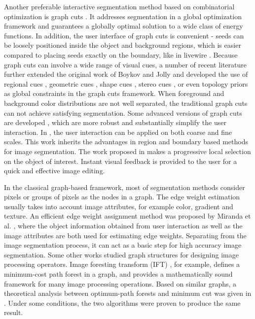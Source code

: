 Another preferable interactive segmentation method based on combinatorial optimization is graph cuts \cite{Yuri01,Yuri06}. It addresses segmentation in a global optimization framework and guarantees a globally optimal solution to a wide class of energy functions. In addition, the user interface of graph cuts is convenient - seeds can be loosely positioned inside the object and background regions, which is easier compared to placing seeds exactly on the boundary, like in livewire \cite{Falaco98}. Because graph cuts can involve a wide range of visual cues, a number of recent literature further extended the original work of Boykov and Jolly \cite{Yuri01} and developed the use of regional cues
\cite{grabcut,stereo}, geometric cues \cite{Yuri_geodesics,Yuri_what}, shape cues \cite{shape2,shape3}, stereo cues \cite{stereo}, or even topology priors \cite{topology} as global constraints in the graph cuts framework. When foreground and background color distributions are not well separated, the traditional graph cuts \cite{Yuri01} can not achieve satisfying segmentation. Some advanced versions of graph cuts are developed \cite{grabcut,lazy,paint,Peng}, which are more robust and substantially simplify the user interaction. In \cite{lazy}, the user interaction can be applied on both coarse and fine scales. This work inherits the advantages in region and boundary based methods for image segmentation. The work proposed in \cite{paint} makes a progressive local selection on the object of interest. Instant visual feedback is provided to the user for a quick and effective image editing.

In the classical graph-based framework, most of segmentation methods consider pixels or groups of pixels as the nodes in a graph. The edge weight estimation usually takes into account image attributes, for example color, gradient and texture. An efficient edge weight assignment method was proposed by Miranda et al. \cite{R1}, where the object information obtained from user interaction as well as the
image attributes are both used for estimating edge weights. Separating from the image segmentation process, it can act as a basic step for high accuracy image segmentation. Some other works studied graph structures for designing image processing operators. Image foresting transform (IFT) \cite{R3, R4}, for example, defines a minimum-cost path forest in a graph, and provides a mathematically sound framework for many image processing operations. Based on similar graphs, a theoretical analysis between optimum-path forests and minimum cut was given in \cite{R5}. Under some conditions, the two algorithms were proven to produce the same result.

